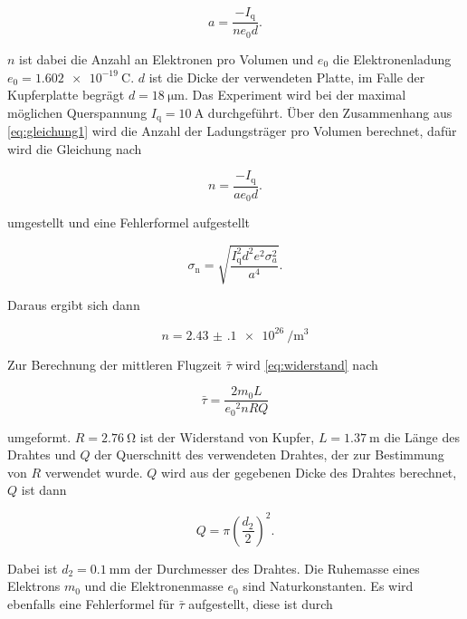 \begin{equation}
    a = \frac{-I_\text{q}}{n e_0 d}.
    \label{eq:gleichung1}
\end{equation}

$n$ ist dabei die Anzahl an Elektronen pro Volumen und $e_0$ die Elektronenladung $e_0 = \SI{1.602e-19}{\coulomb}$. $d$ ist die Dicke der verwendeten Platte, im Falle der Kupferplatte begrägt $d = \SI{18}{\micro\meter}$.
Das Experiment wird bei der maximal möglichen Querspannung $I_\text{q} = \SI{10}{\ampere}$ durchgeführt.
Über den Zusammenhang aus \autoref{eq:gleichung1} wird die Anzahl der Ladungsträger pro Volumen berechnet, dafür wird die Gleichung nach 

\begin{equation}
    n = \frac{-I_\text{q}}{a e_0 d}.
    \label{eq:gleichung2}
\end{equation}

umgestellt und eine Fehlerformel aufgestellt

\begin{equation}
    \sigma _\text{n} = \sqrt{\frac {I_\text{q}^{2} d^{2} e^{2} \sigma_{a}^{2} }{a^{4}}}.
    \label{eq:gleichung3}
\end{equation}

Daraus ergibt sich dann

\begin{equation}
    n = \SI{2.43(10)e26}{\per\cubic\meter}
    \label{eq:n1}
\end{equation}

Zur Berechnung der mittleren Flugzeit $\bar{\tau}$ wird \autoref{eq:widerstand} nach

\begin{equation}
    \bar{\tau} = \frac{2m_0 L}{{e_0}^2 n R Q}
    \label{eq:tau}
\end{equation}

umgeformt.
$R = \SI{2.76}{\ohm}$ ist der Widerstand von Kupfer, $L = \SI{1.37}{\meter}$ die Länge des Drahtes und $Q$ der Querschnitt des verwendeten Drahtes, der zur Bestimmung von $R$ verwendet wurde.
$Q$ wird aus der gegebenen Dicke des Drahtes berechnet, $Q$ ist dann

\begin{equation}
    Q = \pi \left(\frac{d_2}{2}\right)^2.
    \label{eq:Q}
\end{equation}

Dabei ist $d_2 = \SI{0.1}{\milli\meter}$ der Durchmesser des Drahtes.
Die Ruhemasse eines Elektrons $m_0$ und die Elektronenmasse $e_0$ sind Naturkonstanten.\cite{physics_constants}
Es wird ebenfalls eine Fehlerformel für $\bar{\tau}$ aufgestellt, diese ist durch 

